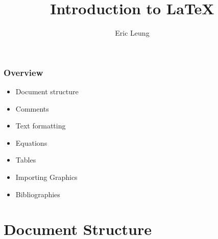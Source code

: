 \documentclass{beamer}
\title{Introduction to \LaTeX}
\author{Eric Leung}
\begin{document}
\frame{\titlepage}

\begin{frame}
\frametitle{Overview}

\begin{itemize}
\item Document structure
\item Comments
\item Text formatting
\item Equations
\item Tables
\item Importing Graphics
\item Bibliographies
\end{itemize}

\end{frame}

\section{Document Structure}

\begin{frame}

\end{frame}
\end{document}
